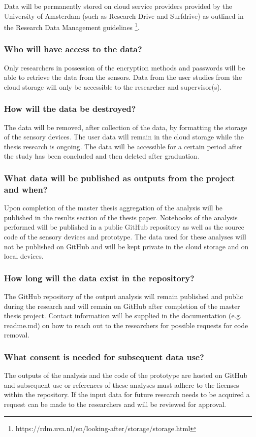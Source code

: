 \documentclass[a4paper]{article}
\begin{document}
Data will be permanently stored on cloud service providers provided by the University of Amsterdam (such as Research Drive and Surfdrive) as outlined in the Research Data Management guidelines \footnote{https://rdm.uva.nl/en/looking-after/storage/storage.html}. 


\subsubsection{Who will have access to the data?}

Only researchers in possession of the encryption methods and passwords will be able to retrieve the data from the sensors. Data from the user studies from the cloud storage will only be accessible to the researcher and supervisor(s).

\subsubsection{How will the data be destroyed?}

The data will be removed, after collection of the data, by formatting the storage of the sensory devices. The user data will remain in the cloud storage while the thesis research is ongoing. The data will be accessible for a certain period after the study has been concluded and then deleted after graduation.

\subsubsection{What data will be published as outputs from the project and when?}

Upon completion of the master thesis aggregation of the analysis will be published in the results section of the thesis paper. Notebooks of the analysis performed will be published in a public GitHub repository as well as the source code of the sensory devices and prototype. The data used for these analyses will not be published on GitHub and will be kept private in the cloud storage and on local devices.

\subsubsection{How long will the data exist in the repository?}

The GitHub repository of the output analysis will remain published and public during the research and will remain on GitHub after completion of the master thesis project. Contact information will be supplied in the documentation (e.g. readme.md) on how to reach out to the researchers for possible requests for code removal.

\subsubsection{What consent is needed for subsequent data use?}

The outputs of the analysis and the code of the prototype are hosted on GitHub and subsequent use or references of these analyses must adhere to the licenses within the repository. If the input data for future research needs to be acquired a request can be made to the researchers and will be reviewed for approval.
\end{document}
